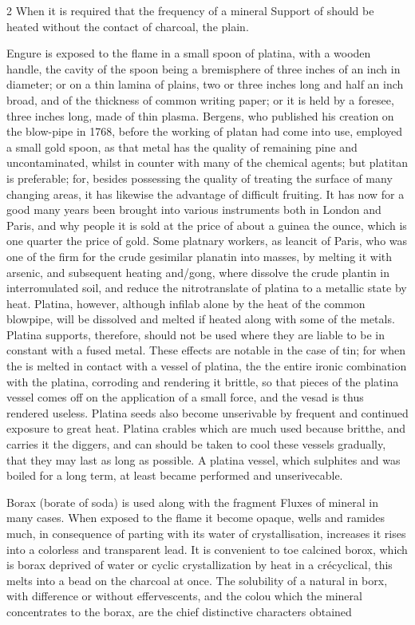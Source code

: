 \documentclass[10pt]{article}
\begin{document}
\begin{multicols}{2}
When it is required that the frequency of a mineral Support of should be heated without the contact of charcoal, the plain.

Engure is exposed to the flame in a small spoon of platina, with a wooden handle, the cavity of the spoon being a bremisphere of three inches of an inch in diameter; or on a thin lamina of plains, two or three inches long and half an inch broad, and of the thickness of common writing paper; or it is held by a foresee, three inches long, made of thin plasma. Bergens, who published his creation on the blow-pipe in 1768, before the working of platan had come into use, employed a small gold spoon, as that metal has the quality of remaining pine and uncontaminated, whilst in counter with many of the chemical agents; but platitan is preferable; for, besides possessing the quality of treating the surface of many changing areas, it has likewise the advantage of difficult fruiting. It has now for a good many years been brought into various instruments both in London and Paris, and why people it is sold at the price of about a guinea the ounce, which is one quarter the price of gold. Some platnary workers, as leancit of Paris, who was one of the firm for the crude gesimilar planatin into masses, by melting it with arsenic, and subsequent heating and/gong, where dissolve the crude plantin in interromulated soil, and reduce the nitrotranslate of platina to a metallic state by heat. Platina, however, although infilab alone by the heat of the common blowpipe, will be dissolved and melted if heated along with some of the metals. Platina supports, therefore, should not be used where they are liable to be in constant with a fused metal. These effects are notable in the case of tin; for when the is melted in contact with a vessel of platina, the the entire ironic combination with the platina, corroding and rendering it brittle, so that pieces of the platina vessel comes off on the application of a small force, and the vesad is thus rendered useless. Platina seeds also become unserivable by frequent and continued exposure to great heat. Platina crables which are much used because britthe, and carries it the diggers, and can should be taken to cool these vessels gradually, that they may last as long as possible. A platina vessel, which sulphites and was boiled for a long term, at least became performed and unserivecable.

Borax (borate of soda) is used along with the fragment Fluxes of mineral in many cases. When exposed to the flame it become opaque, wells and ramides much, in consequence of parting with its water of crystallisation, increases it rises into a colorless and transparent lead. It is convenient to toe calcined borox, which is borax deprived of water or cyclic crystallization by heat in a crécyclical, this melts into a bead on the charcoal at once. The solubility of a natural in borx, with difference or without effervescents, and the colou which the mineral concentrates to the borax, are the chief distinctive characters obtained

\end{multicols}
\end{document}
